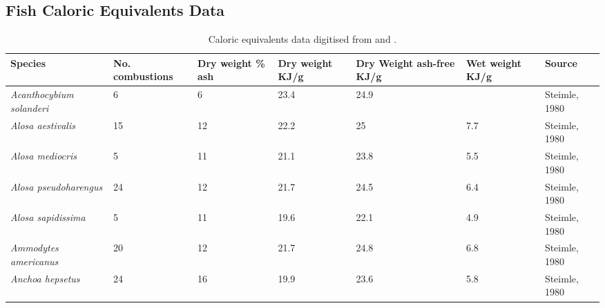 \documentclass[a4paper]{article} %
\begin{document}
\newpage
\begin{landscape}
\pagestyle{empty}
\section{Fish Caloric Equivalents Data}
\begin{longtable}[]{|l|p{1.8cm}|p{2cm}|p{2cm}|p{2.15cm}|p{1.9cm}|l|}
    \caption{Caloric equivalents data digitised from \cite{Steimle1980} and \cite{Cummins1971}.} \\
    \hline
    \textbf{Species}                         & \textbf{No. combustions} & \textbf{Dry weight \% ash} & \textbf{Dry weight KJ/g}     & \textbf{Dry Weight ash-free KJ/g}         & \textbf{Wet weight KJ/g} & \textbf{Source}           \\ \hline
    \textit{Acanthocybium solanderi}         & 6                            & 6                          & 23.4                          & 24.9                              &                          & Steimle, 1980                \\ \hline
    \textit{Alosa aestivalis}                & 15                           & 12                         & 22.2                          & 25                                & 7.7                      & Steimle, 1980                \\ \hline
    \textit{Alosa mediocris}                 & 5                            & 11                         & 21.1                          & 23.8                              & 5.5                      & Steimle, 1980                \\ \hline
    \textit{Alosa pseudoharengus}            & 24                           & 12                         & 21.7                          & 24.5                              & 6.4                      & Steimle, 1980                \\ \hline
    \textit{Alosa sapidissima}               & 5                            & 11                         & 19.6                          & 22.1                              & 4.9                      & Steimle, 1980                \\ \hline
    \textit{Ammodytes americanus}            & 20                           & 12                         & 21.7                          & 24.8                              & 6.8                      & Steimle, 1980                \\ \hline
    \textit{Anchoa hepsetus}                 & 24                           & 16                         & 19.9                          & 23.6                              & 5.8                      & Steimle, 1980                \\ \hline

\end{longtable}
\end{landscape}
\end{document}
